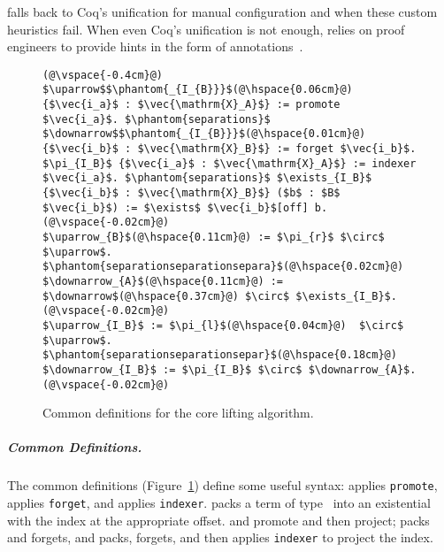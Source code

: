 \toolnamec falls back to Coq's unification for manual configuration and when these custom heuristics fail.
When even Coq's unification is not enough, \toolnamec relies on proof engineers to provide hints
in the form of annotations~\href{https://github.com/uwplse/pumpkin-pi/blob/v2.0.0/plugin/coq/nonorn.v}{}.

\iffalse
\begin{figure}
\begin{lstlisting}
(@\vspace{-0.4cm}@)
$\uparrow$$\phantom{_{I_{B}}}$(@\hspace{0.06cm}@) {$\vec{i_a}$ : $\vec{\mathrm{X}_A}$} := promote $\vec{i_a}$. $\phantom{separations}$ $\downarrow$$\phantom{_{I_{B}}}$(@\hspace{0.01cm}@) {$\vec{i_b}$ : $\vec{\mathrm{X}_B}$} := forget $\vec{i_b}$.
$\pi_{I_B}$ {$\vec{i_a}$ : $\vec{\mathrm{X}_A}$} := indexer $\vec{i_a}$. $\phantom{separations}$ $\exists_{I_B}$ {$\vec{i_b}$ : $\vec{\mathrm{X}_B}$} ($b$ : $B$ $\vec{i_b}$) := $\exists$ $\vec{i_b}$[off] b.(@\vspace{-0.02cm}@)
$\uparrow_{B}$(@\hspace{0.11cm}@) := $\pi_{r}$ $\circ$ $\uparrow$. $\phantom{separationseparationsepara}$(@\hspace{0.02cm}@) $\downarrow_{A}$(@\hspace{0.11cm}@) := $\downarrow$(@\hspace{0.37cm}@) $\circ$ $\exists_{I_B}$.(@\vspace{-0.02cm}@)
$\uparrow_{I_B}$ := $\pi_{l}$(@\hspace{0.04cm}@)  $\circ$ $\uparrow$. $\phantom{separationseparationsepar}$(@\hspace{0.18cm}@) $\downarrow_{I_B}$ := $\pi_{I_B}$ $\circ$ $\downarrow_{A}$.(@\vspace{-0.02cm}@)
\end{lstlisting}
\vspace{-0.3cm}
\caption{Common definitions for the core lifting algorithm.}
\label{fig:convenience}
\end{figure}

\subparagraph*{Common Definitions.} The common definitions (Figure~\ref{fig:convenience}) %
define some useful syntax:
\smallmath{$\uparrow$} applies \lstinline{promote}, \smallmath{$\downarrow$} applies
\lstinline{forget}, and  applies \lstinline{indexer}.
 packs a term of type \B\
into an existential with the index at the appropriate offset.  and  promote and then project;
\smallmath{$\downarrow_{A}$} packs and forgets, and \smallmath{$\downarrow_{I_B}$} packs, forgets, and then 
applies \lstinline{indexer} to project the index.

